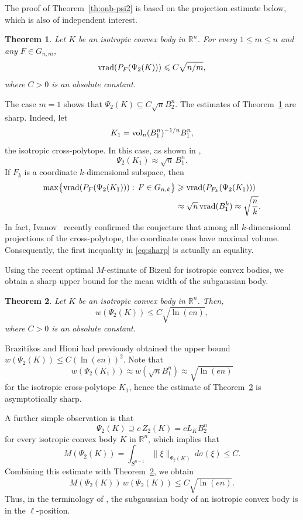 \documentclass[11pt,leqno]{article}
\newtheorem{theorem}{Theorem}[section]
\theoremstyle{definition}
\numberwithin{equation}{section}
\newcommand{\ls}{\leqslant}
\newcommand{\gr}{\geqslant}
\begin{document}
The proof of Theorem~\ref{th:onb-psi2} is based on the projection estimate below, which is also of independent interest.

\begin{theorem}\label{th:vk-psi2-body}
Let $K$ be an isotropic convex body in $\mathbb{R}^n$. For every $1\ls m\ls n$ and any $F\in G_{n,m}$,
\begin{equation*}{\rm vrad}(P_F(\Psi_2(K)))\ls C\sqrt{n/m},\end{equation*} 
where $C>0$ is an absolute constant. 
\end{theorem}

The case $m=1$ shows that $\Psi_2(K)\subseteq C\sqrt{n}B_2^n$. The estimates of Theorem~\ref{th:vk-psi2-body} are sharp. Indeed, let
\[K_1={\rm vol}_n(B_1^n)^{-1/n}B_1^n,\]
the isotropic cross-polytope. In this case, as shown in \cite{Bobkov-Nazarov-2003}, 
\[\Psi_2(K_1)\approx\sqrt n\,B_1^n.\]
If $F_k$ is a coordinate $k$-dimensional subspace, then
\begin{align}\label{eq:sharp}
\max\bigl\{{\rm vrad}(P_F(\Psi_2(K_1))):\,F\in G_{n,k}\bigr\}
&\gr {\rm vrad}(P_{F_k}(\Psi_2(K_1)))\\
\nonumber &\approx \sqrt n\,{\rm vrad}(B_1^k)\approx\sqrt{\frac nk}.
\end{align}
In fact, Ivanov~\cite{Ivanov-2026} recently confirmed the conjecture that
among all $k$-dimensional projections of the cross-polytope, the coordinate
ones have maximal volume. Consequently, the first inequality in
\eqref{eq:sharp} is actually an equality.

Using the recent optimal $M$-estimate of Bizeul \cite{Bizeul-M-2026} for isotropic convex bodies,
we obtain a sharp upper bound for the mean width of the subgaussian body.


\begin{theorem}\label{th:mean-width}Let $K$ be an isotropic convex body in ${\mathbb{R}}^n$. Then,
\[w(\Psi_2(K))\ls C\sqrt{\ln(en)},\]
where $C>0$ is an absolute constant.
\end{theorem}

Brazitikos and Hioni \cite{Brazitikos-Hioni-2015} had previously obtained the upper bound $w(\Psi_2(K))\ls C(\ln(en))^2$. Note that
$$w(\Psi_2(K_1))\approx w(\sqrt{n}B_1^n)\approx\sqrt{\ln(en)}$$
for the isotropic cross-polytope $K_1$, hence the estimate of Theorem~\ref{th:mean-width} is asymptotically sharp. 

A further simple observation is that \[\Psi_2(K)\supseteq c\,Z_2(K)=cL_KB_2^n\]
for every isotropic convex body $K$ in $\mathbb{R}^n$, which implies that
\[M(\Psi_2(K))=\int_{S^{n-1}}\|\xi\|_{\Psi_2(K)}\,d\sigma(\xi)\ls C.\]
Combining this estimate with Theorem~\ref{th:mean-width}, we obtain
\[M(\Psi_2(K))\,w(\Psi_2(K))\ls C\sqrt{\ln(en)}.\]
Thus, in the terminology of \cite[Chapter~6]{AGA-book}, the subgaussian body of an isotropic convex body is in the $\ell$-position.
\end{document}

